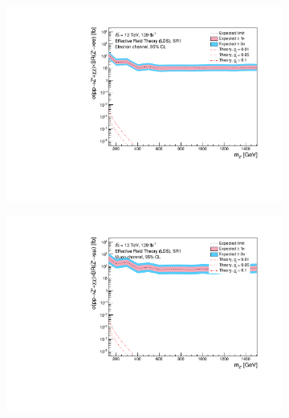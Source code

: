 \documentclass[12pt, a4paper]{book}
\begin{document}
\begin{figure}[!ht]
	\centering
	\begin{subfigure}[b]{0.49\textwidth}
      \centering
      \includegraphics[width=1\textwidth]{Limits/Model_independent/50-100/EFT_LDS/mass_exclusion_ee.pdf}
   \end{subfigure}
   \hfill
   \begin{subfigure}[b]{0.49\textwidth}
      \centering
      \includegraphics[width=1\textwidth]{Limits/Model_independent/50-100/EFT_LDS/mass_exclusion_uu.pdf}
   \end{subfigure}
   \hfill
   \begin{subfigure}[b]{0.49\textwidth}
      \centering

\end{subfigure}
\end{figure}
\end{document}
